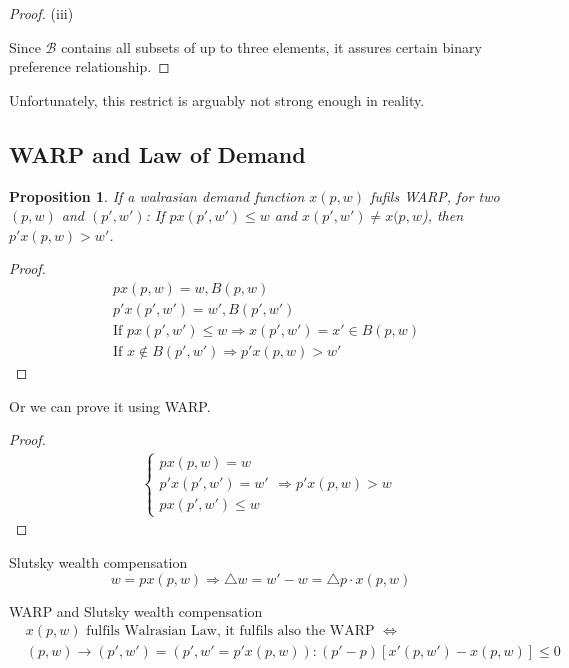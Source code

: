 \documentclass{article}
\newtheorem{proposition}{Proposition}
\begin{document}
\begin{proof}
(iii)

Since $\mathscr{B}$ contains all subsets of up to three elements, it assures certain binary preference relationship.
\end{proof}



Unfortunately, this restrict is arguably not strong enough in reality.

\subsection{WARP and Law of Demand}

\begin{proposition}
If a walrasian demand function $x(p,w)$ fufils WARP, for two $(p,w)$ and $(p',w')$:
If $px(p',w')\leqslant w$ and $x(p',w') \neq x(p,w$), then $p' x(p,w)>w'$.
\end{proposition}

\begin{proof}
\begin{align}
& px(p,w)=w, B(p,w) 
\\&p'x(p',w')=w', B(p',w')
\\&\text{If } px(p',w')\le w \Rightarrow x(p',w')=x'\in B(p,w)
\\&\text{If }x\notin B(p',w') \Rightarrow p' x(p,w)>w'
\end{align}
\end{proof}

Or we can prove it using WARP.
\begin{proof}
\begin{align}
&\begin{cases}
px(p,w)=w \\
p'x(p',w')=w' \\
px(p',w')\leq w\end{cases} \Rightarrow p'x(p,w)>w
\end{align}
\end{proof}

Slutsky wealth compensation
$$w=px(p,w)\Rightarrow \triangle w=w'-w=\triangle p \cdot x(p,w)$$

WARP and Slutsky wealth compensation
\begin{align}
& x(p,w) \text{ fulfils Walrasian Law, it fulfils also the WARP }\iff
\\&(p,w)\rightarrow(p',w')=(p',w'=p'x(p,w)): (p'-p)[x'(p,w')-x(p,w)]\leqslant0
\end{align}
\end{document}
